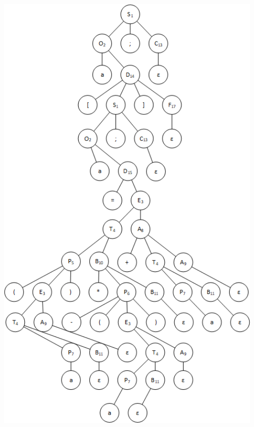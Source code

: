 \documentclass[a4paper,14pt]{extarticle}
\begin{document}
\begin{enumerate}[1.]
\begin{itemize}
    \includegraphics[width=140mm]{task_6_1}


\end{itemize}
\end{enumerate}
\end{document}
